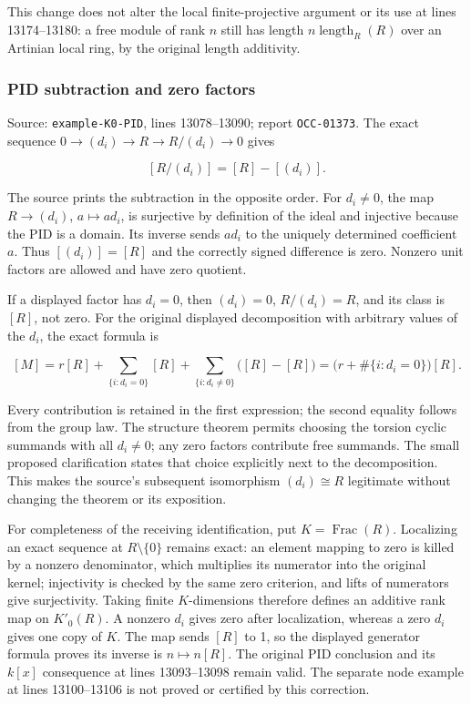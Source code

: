 This change does not alter the local finite-projective argument or its use at lines 13174--13180: a free module of rank \(n\) still has length \(n\operatorname{length}_R(R)\) over an Artinian local ring, by the original length additivity.

\subsubsection{PID subtraction and zero factors}\label{pid-subtraction-and-zero-factors}

Source: \texttt{example-K0-PID}, lines 13078--13090; report \texttt{OCC-01373}. The exact sequence \(0\to(d_i)\to R\to R/(d_i)\to0\) gives

\[
[R/(d_i)]=[R]-[(d_i)].
\]

The source prints the subtraction in the opposite order. For \(d_i\ne0\), the map \(R\to(d_i)\), \(a\mapsto ad_i\), is surjective by definition of the ideal and injective because the PID is a domain. Its inverse sends \(ad_i\) to the uniquely determined coefficient \(a\). Thus \([(d_i)]=[R]\) and the correctly signed difference is zero. Nonzero unit factors are allowed and have zero quotient.

If a displayed factor has \(d_i=0\), then \((d_i)=0\), \(R/(d_i)=R\), and its class is \([R]\), not zero. For the original displayed decomposition with arbitrary values of the \(d_i\), the exact formula is

\[
[M]=r[R]+\sum_{\{i:d_i=0\}}[R]
       +\sum_{\{i:d_i\ne0\}}\bigl([R]-[R]\bigr)
     =\bigl(r+\#\{i:d_i=0\}\bigr)[R].
\]

Every contribution is retained in the first expression; the second equality follows from the group law. The structure theorem permits choosing the torsion cyclic summands with all \(d_i\ne0\); any zero factors contribute free summands. The small proposed clarification states that choice explicitly next to the decomposition. This makes the source's subsequent isomorphism \((d_i)\cong R\) legitimate without changing the theorem or its exposition.

For completeness of the receiving identification, put \(K=\operatorname{Frac}(R)\). Localizing an exact sequence at \(R\setminus\{0\}\) remains exact: an element mapping to zero is killed by a nonzero denominator, which multiplies its numerator into the original kernel; injectivity is checked by the same zero criterion, and lifts of numerators give surjectivity. Taking finite \(K\)-dimensions therefore defines an additive rank map on \(K'_0(R)\). A nonzero \(d_i\) gives zero after localization, whereas a zero \(d_i\) gives one copy of \(K\). The map sends \([R]\) to 1, so the displayed generator formula proves its inverse is \(n\mapsto n[R]\). The original PID conclusion and its \(k[x]\) consequence at lines 13093--13098 remain valid. The separate node example at lines 13100--13106 is not proved or certified by this correction.

